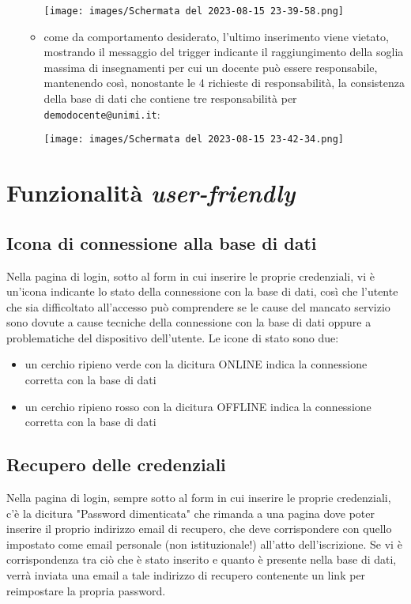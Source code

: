 \documentclass{article}
\newcommand{\und}[0]{\textunderscore}
\begin{document}
\begin{itemize}
\begin{itemize}
        \texttt{[image: images/Schermata del 2023-08-15 23-39-58.png]}

        \pagebreak

        \item come da comportamento desiderato, l'ultimo inserimento viene vietato, mostrando il messaggio del trigger indicante il raggiungimento della soglia massima di insegnamenti per cui un docente può essere responsabile, mantenendo così, nonostante le 4 richieste di responsabilità, la consistenza della base di dati che contiene tre responsabilità per \texttt{demo\und docente@unimi.it}:

        \texttt{[image: images/Schermata del 2023-08-15 23-42-34.png]}
    \end{itemize}

    \pagebreak

\end{itemize}
\section{Funzionalità \textit{user-friendly}}
\subsection{Icona di connessione alla base di dati}
Nella pagina di login, sotto al form in cui inserire le proprie credenziali, vi è un'icona indicante lo stato della connessione con la base di dati, così che l'utente che sia difficoltato all'accesso può comprendere se le cause del mancato servizio sono dovute a cause tecniche della connessione con la base di dati oppure a problematiche del dispositivo dell'utente. Le icone di stato sono due:
\begin{itemize}
    \item un cerchio ripieno verde con la dicitura ONLINE indica la connessione corretta con la base di dati
    \item un cerchio ripieno rosso con la dicitura OFFLINE indica la connessione corretta con la base di dati
\end{itemize}
\subsection{Recupero delle credenziali}
Nella pagina di login, sempre sotto al form in cui inserire le proprie credenziali, c'è la dicitura "Password dimenticata" che rimanda a una pagina dove poter inserire il proprio indirizzo email di recupero, che deve corrispondere con quello impostato come email personale (non istituzionale!) all'atto dell'iscrizione. Se vi è corrispondenza tra ciò che è stato inserito e quanto è presente nella base di dati, verrà inviata una email a tale indirizzo di recupero contenente un link per reimpostare la propria password.
\end{document}

